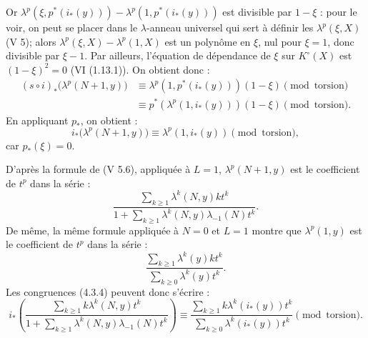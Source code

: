 Or \(\lambda^p(\xi,p^*(i_*(y)))-\lambda^p(1,p^*(i_*(y)))\) est divisible par \(1-\xi\) :
pour le voir, on peut se placer dans le \(\lambda\)-anneau universel qui sert à définir les \(\lambda^p(\xi,X)\) (V 5); alors \(\lambda^p(\xi,X)-\lambda^p(1,X)\) est un polynôme en \(\xi\), nul pour \(\xi=1\), donc divisible par \(\xi-1\). Par ailleurs, l'équation de dépendance de \(\xi\) sur \(K^\circ(X)\) est \((1-\xi)^2=0\) (VI (1.13.1)). On obtient donc :
\[
\begin{aligned}
(s\circ i)_*\bigl(\lambda^p(N+1,y)\bigr)
&\equiv \lambda^p(1,p^*(i_*(y)))(1-\xi) \pmod{\text{torsion}}\\
&\equiv p^*(\lambda^p(1,i_*(y)))(1-\xi) \pmod{\text{torsion}}.
\end{aligned}
\]
En appliquant \(p_*\), on obtient :
\begin{equation}\tag{4.3.4}
  i_*\bigl(\lambda^p(N+1,y)\bigr)
  \equiv \lambda^p(1,i_*(y)) \pmod{\text{torsion}},
\end{equation}
car \(p_*(\xi)=0\).

D'après la formule de (V 5.6), appliquée à \(L=1\), \(\lambda^p(N+1,y)\) est le coefficient de \(t^p\) dans la série :
\[
  \frac{\sum_{k\ge1}\lambda^k(N,y)kt^k}
       {1+\sum_{k\ge1}\lambda^k(N,y)\lambda_{-1}(N)t^k}.
\]
De même, la même formule appliquée à \(N=0\) et \(L=1\) montre que \(\lambda^p(1,y)\) est le coefficient de \(t^p\) dans la série :
\[
  \frac{\sum_{k\ge1}\lambda^k(y)kt^k}
       {\sum_{k\ge0}\lambda^k(y)t^k}.
\]
Les congruences (4.3.4) peuvent donc s'écrire :
\[
i_*\left(
  \frac{\sum_{k\ge1}k\lambda^k(N,y)t^k}
       {1+\sum_{k\ge1}\lambda^k(N,y)\lambda_{-1}(N)t^k}
\right)
\equiv
  \frac{\sum_{k\ge1}k\lambda^k(i_*(y))t^k}
       {\sum_{k\ge0}\lambda^k(i_*(y))t^k}
       \pmod{\text{torsion}}.
\]
